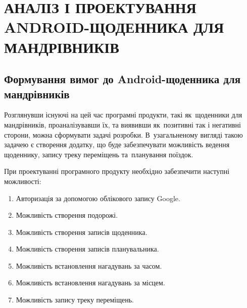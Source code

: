 \documentclass[../main.tex]{subfiles}
\begin{document}
\chapter{АНАЛІЗ І ПРОЕКТУВАННЯ ANDROID-ЩОДЕННИКА ДЛЯ МАНДРІВНИКІВ}

\section{Формування вимог до Android-щоденника для мандрівників}

Розглянувши існуючі на цей час програмні продукти, такі як~щоденники для мандрівників, проаналізувавши їх, та виявивши як~позитивні так і негативні сторони, можна сформувати задачі розробки. В~узагальненому вигляді такою задачею є створення додатку, що буде забезпечувати можливість ведення щоденнику, запису треку переміщень та~планування поїздок.

При проектуванні програмного продукту необхідно забезпечити наступні можливості:
\begin{enumerate}
	\item Авторизація за допомогою облікового запису Google.
	\item Можливість створення подорожі.
	\item Можливість створення записів щоденника.
	\item Можливість створення записів планувальника.
	\item Можливість встановлення нагадувань за часом.
	\item Можливість встановлення нагадувань за місцем.
	\item Можливість запису треку переміщень.
\end{enumerate}
\end{document}
